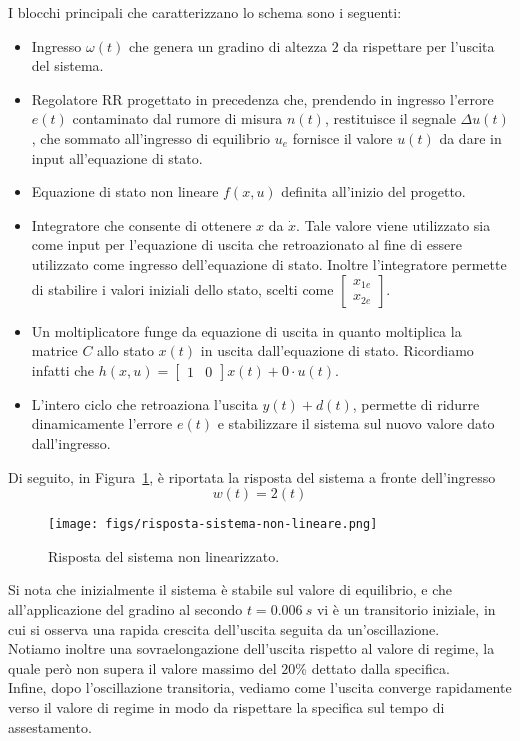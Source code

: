 \documentclass[a4paper, 11pt]{article}
\begin{document}
I blocchi principali che caratterizzano lo schema sono i seguenti:
\begin{itemize}
    \item Ingresso $\omega(t)$ che genera un gradino di altezza $2$ da rispettare per l'uscita del sistema.
    \item Regolatore RR progettato in precedenza che, prendendo in ingresso l'errore $e(t)$ contaminato dal rumore di misura $n(t)$, restituisce il segnale $\Delta u(t)$, che sommato all'ingresso di equilibrio $u_e$ fornisce il valore $u(t)$ da dare in input all'equazione di stato.
    \item Equazione di stato non lineare $f(x, u)$ definita all'inizio del progetto.
    \item Integratore che consente di ottenere $x$ da $\dot x$. Tale valore viene utilizzato sia come input per l'equazione di uscita che retroazionato al fine di essere utilizzato come ingresso dell'equazione di stato. Inoltre l’integratore permette di stabilire i valori iniziali dello stato, scelti come
    $\begin{bmatrix}
        x_{1e}
        \\
        x_{2e}
    \end{bmatrix}$.
    \item Un moltiplicatore funge da equazione di uscita in quanto moltiplica la matrice $C$ allo stato $x(t)$ in uscita dall'equazione di stato. Ricordiamo infatti che $h(x, u) = \begin{bmatrix}
        1 & 0
    \end{bmatrix} x(t) + 0 \cdot u(t)$.
    \item L'intero ciclo che retroaziona l'uscita $y(t) + d(t)$, permette di ridurre dinamicamente l'errore $e(t)$ e stabilizzare il sistema sul nuovo valore dato dall'ingresso.
\end{itemize}

Di seguito, in Figura~\ref{RispostaSistemaNonLineare}, è riportata la risposta del sistema a fronte dell'ingresso \[w(t) = 2(t)\]

\begin{figure}[H]
    \centering
    \texttt{[image: figs/risposta-sistema-non-lineare.png]}
    \caption{Risposta del sistema non linearizzato.}
    \label{RispostaSistemaNonLineare}
\end{figure}

Si nota che inizialmente il sistema è stabile sul valore di equilibrio, e che all'applicazione del gradino al secondo $t = 0.006 \ s$ vi è un transitorio iniziale, in cui si osserva una rapida crescita dell'uscita seguita da un'oscillazione.\\
Notiamo inoltre una sovraelongazione dell'uscita rispetto al valore di regime, la quale però non supera il valore massimo del $20\%$ dettato dalla specifica.\\
Infine, dopo l'oscillazione transitoria, vediamo come l'uscita converge rapidamente verso il valore di regime in modo da rispettare la specifica sul tempo di assestamento.
\end{document}
